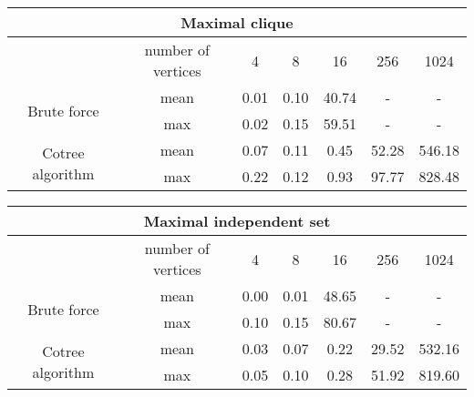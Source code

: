 \begin{center}
    \begin{tabular}{|c|c|c|c|c|c|c|}
        \hline
        \multicolumn{7}{|c|}{Maximal clique}                                                          \\
        \hline
                                          & number of vertices & 4    & 8    & 16    & 256   & 1024   \\
        \hline

        \multirow{2}{*}{Brute force}      & mean               & 0.01 & 0.10 & 40.74 & -     & -      \\
                                          & max                & 0.02 & 0.15 & 59.51 & -     & -      \\
        \hline
        \multirow{2}{*}{Cotree algorithm} & mean               & 0.07 & 0.11 & 0.45  & 52.28 & 546.18 \\
                                          & max                & 0.22 & 0.12 & 0.93  & 97.77 & 828.48 \\
        \hline
    \end{tabular}
\end{center}


\begin{center}
    \begin{tabular}{|c|c|c|c|c|c|c|}
        \hline
        \multicolumn{7}{|c|}{Maximal independent set}                                                 \\
        \hline
                                          & number of vertices & 4    & 8    & 16    & 256   & 1024   \\
        \hline

        \multirow{2}{*}{Brute force}      & mean               & 0.00 & 0.01 & 48.65 & -     & -      \\
                                          & max                & 0.10 & 0.15 & 80.67 & -     & -      \\
        \hline
        \multirow{2}{*}{Cotree algorithm} & mean               & 0.03 & 0.07 & 0.22  & 29.52 & 532.16 \\
                                          & max                & 0.05 & 0.10 & 0.28  & 51.92 & 819.60 \\
        \hline
    \end{tabular}
\end{center}


